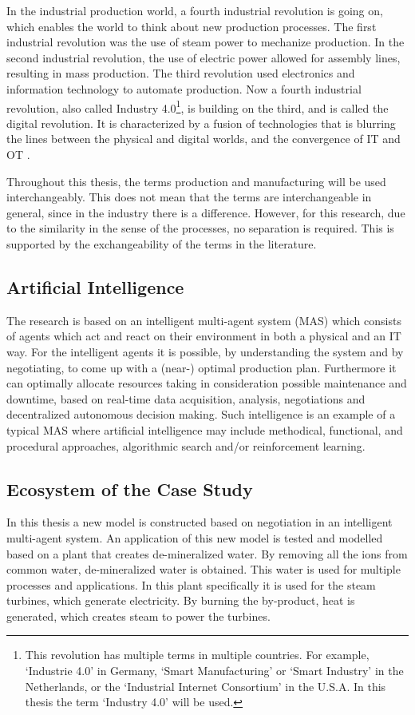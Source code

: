 In the industrial production world, a fourth industrial revolution is going on, which enables the world to think about new production processes. The first industrial revolution was the use of steam power to mechanize production. In the second industrial revolution, the use of electric power allowed for assembly lines, resulting in mass production. The third revolution used electronics and information technology to automate production. Now a fourth industrial revolution, also called Industry 4.0\footnote{This revolution has multiple terms in multiple countries. For example, `Industrie 4.0' in Germany, `Smart Manufacturing' or `Smart Industry' in the Netherlands, or the `Industrial Internet Consortium' in the U.S.A. In this thesis the term `Industry 4.0' will be used.}, is building on the third, and is called the digital revolution. It is characterized by a fusion of technologies that is blurring the lines between the physical and digital worlds, and the convergence of IT and OT \citep{leitao2016smart}.

Throughout this thesis, the terms production and manufacturing will be used interchangeably. This does not mean that the terms are interchangeable in general, since in the industry there is a difference. However, for this research, due to the similarity in the sense of the processes, no separation is required. This is supported by the exchangeability of the terms in the literature.

\subsection{Artificial Intelligence}
The research is based on an intelligent multi-agent system (MAS) which consists of agents which act and react on their environment in both a physical and an IT way. For the intelligent agents it is possible, by understanding the system and by negotiating, to come up with a (near-) optimal production plan. Furthermore it can optimally allocate resources taking in consideration possible maintenance and downtime, based on real-time data acquisition, analysis, negotiations and decentralized autonomous decision making. Such intelligence is an example of a typical MAS where artificial intelligence may include methodical, functional, and procedural approaches, algorithmic search and/or reinforcement learning.

\subsection{Ecosystem of the Case Study}
\label{sec:intro_ecosystem}
In this thesis a new model is constructed based on negotiation in an intelligent multi-agent system. An application of this new model is tested and modelled based on a plant that creates de-mineralized water. By removing all the ions from common water, de-mineralized water is obtained. This water is used for multiple processes and applications. In this plant specifically it is used for the steam turbines, which generate electricity. By burning the by-product, heat is generated, which creates steam to power the turbines.

